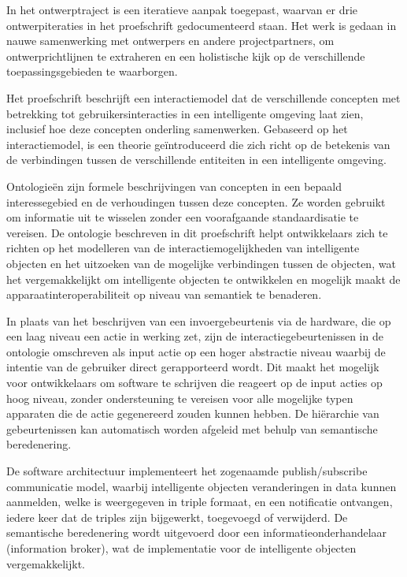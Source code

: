 In het ontwerptraject is een iteratieve aanpak toegepast, waarvan er drie ontwerpiteraties in het proefschrift gedocumenteerd staan. Het werk is gedaan in nauwe samenwerking met ontwerpers en andere projectpartners, om ontwerprichtlijnen te extraheren en een holistische kijk op de verschillende toepassingsgebieden te waarborgen. 

Het proefschrift beschrijft een interactiemodel dat de verschillende concepten met betrekking tot gebruikersinteracties in een intelligente omgeving laat zien, inclusief hoe deze concepten onderling samenwerken. Gebaseerd op het interactiemodel, is een theorie ge\"introduceerd die zich richt op de betekenis van de verbindingen tussen de verschillende entiteiten in een intelligente omgeving. 

Ontologie\"en zijn formele beschrijvingen van concepten in een bepaald interessegebied en de verhoudingen tussen deze concepten. Ze worden gebruikt om informatie uit te wisselen zonder een voorafgaande standaardisatie te vereisen. De ontologie beschreven in dit proefschrift helpt ontwikkelaars zich te richten op het modelleren van de interactiemogelijkheden van intelligente objecten en het uitzoeken van de mogelijke ver\-bin\-ding\-en tussen de objecten, wat het vergemakkelijkt om intelligente objecten te ontwikkelen en mogelijk maakt de apparaatinteroperabiliteit op niveau van semantiek te benaderen. 

In plaats van het beschrijven van een invoergebeurtenis via de hardware, die op een laag niveau een actie in werking zet, zijn de interactiegebeurtenissen in de ontologie omschreven als input actie op een hoger abstractie niveau waarbij de intentie van de gebruiker direct gerapporteerd wordt. Dit maakt het mogelijk voor ontwikkelaars om software te schrijven die reageert op de input acties op hoog niveau, zonder ondersteuning te vereisen voor alle mogelijke typen apparaten die de actie gegenereerd zouden kunnen hebben. De hi\"erarchie van gebeurtenissen kan automatisch worden afgeleid met behulp van semantische beredenering.

De software architectuur implementeert het zogenaamde publish/subscribe communicatie model, waarbij intelligente ob\-jec\-ten veranderingen in data kunnen aanmelden, welke is weer\-ge\-ge\-ven in triple formaat, en een notificatie ontvangen, iedere keer dat de triples zijn bijgewerkt, toegevoegd of verwijderd. De semantische beredenering wordt uitgevoerd door een informatieonderhandelaar (information broker), wat de implementatie voor de intelligente objecten vergemakkelijkt. 

